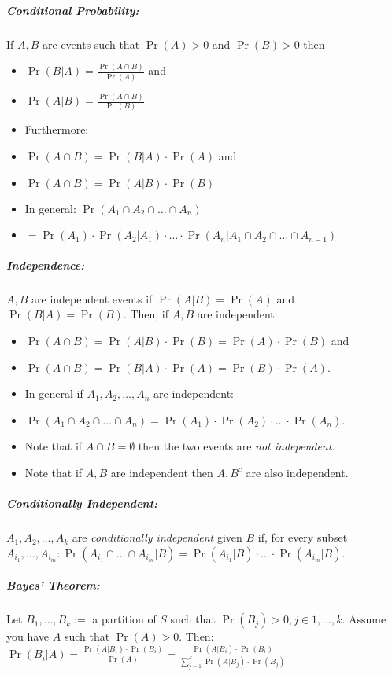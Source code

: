 \documentclass[landscape,10pt]{article}
\begin{document}
\begin{multicols}{4}
    \subparagraph*{Conditional Probability: }
        If \(A, B\) are events such that \(\Pr(A) > 0\) and \(\Pr(B) > 0\) then 
        \begin{itemize}
            \item[] \(\Pr(B|A) = \frac{\Pr(A\cap B)}{\Pr(A)}\) and 
            \item[] \(\Pr(A|B) = \frac{\Pr(A \cap B)}{\Pr(B)}\) 
            \item[] Furthermore: 
            \item[] \(\Pr(A \cap B) = \Pr(B|A) \cdot \Pr(A)\) and 
            \item[] \(\Pr(A \cap B) = \Pr(A|B) \cdot \Pr(B)\) 
            \item[] In general: \(\Pr(A_1 \cap A_2 \cap \ldots \cap A_n) \)
            \item[] \(= \Pr(A_1) \cdot \Pr(A_2 | A_1) \cdot \ldots \cdot \Pr(A_n | A_1 \cap A_2 \cap \ldots \cap A_{n-1})\)
        \end{itemize}

    \subparagraph*{Independence:}
        \(A, B\) are independent events if \(\Pr(A|B) = \Pr(A)\) and \(\Pr(B|A) = \Pr(B)\). Then, if \(A, B\) are independent: 
        \begin{itemize}
            \item[] \(\Pr(A \cap B) = \Pr(A|B) \cdot \Pr(B) = \Pr(A) \cdot \Pr(B)\) and 
            \item[] \(\Pr(A \cap B) = \Pr(B | A) \cdot \Pr(A) = \Pr(B) \cdot \Pr(A)\).
            \item[] In general if \(A_1, A_2, \ldots, A_n\) are independent: 
            \item[] \(\Pr(A_1 \cap A_2 \cap \ldots \cap A_n) = \Pr(A_1) \cdot \Pr(A_2) \cdot \ldots \cdot \Pr(A_n)\). 
            \item[] Note that if \(A \cap B = \emptyset\) then the two events are \textit{not independent}. 
            \item[] Note that if \(A, B\) are independent then \(A, B^c\) are also independent.
        \end{itemize}

    \subparagraph*{Conditionally Independent: } 
        \(A_1, A_2, \ldots, A_k\) are \textit{conditionally independent} given \(B\) if, for every subset \(A_{i_1}, \ldots, A_{i_m}: \Pr(A_{i_1} \cap \ldots \cap A_{i_m} | B) = \Pr(A_{i_1} | B) \cdot \ldots \cdot \Pr(A_{i_m} | B)\).

    \subparagraph*{Bayes' Theorem:}
        Let \(B_1, \ldots, B_k :=\) a partition of \(S\) such that \(\Pr(B_j) > 0, j \in 1, \ldots, k\). Assume you have \(A\) such that \(\Pr(A) > 0\). Then: \(\Pr(B_i|A) = \frac{\Pr(A|B_i) \cdot \Pr(B_i)}{\Pr(A)} = \frac{\Pr(A|B_i) \cdot \Pr(B_i)}{\sum\limits_{j=1}^{k}\Pr(A|B_j) \cdot \Pr(B_j)}\)


\end{multicols}
\end{document}
